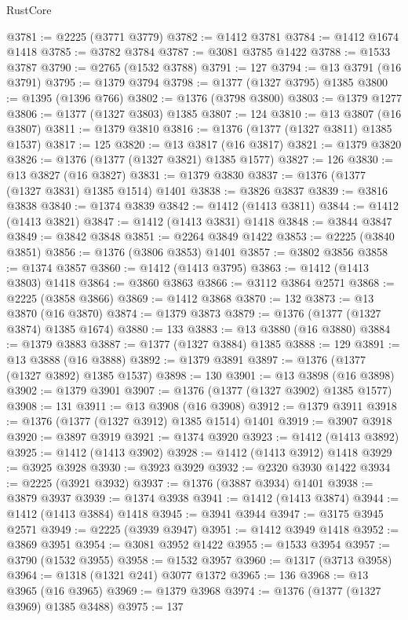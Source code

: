 \begin{lexlean}{RustCore}
\begin{coremodule}
@3781 := @2225 (@3771 @3779)
@3782 := @1412 @3781
@3784 := @1412 @1674 @1418
@3785 := @3782 @3784
@3787 := @3081 @3785 @1422
@3788 := @1533 @3787
@3790 := @2765 (@1532 @3788)
@3791 := 127
@3794 := @13 @3791 (@16 @3791)
@3795 := @1379 @3794
@3798 := @1377 (@1327 @3795) @1385
@3800 := @1395 (@1396 @766)
@3802 := @1376 (@3798 @3800)
@3803 := @1379 @1277
@3806 := @1377 (@1327 @3803) @1385
@3807 := 124
@3810 := @13 @3807 (@16 @3807)
@3811 := @1379 @3810
@3816 := @1376 (@1377 (@1327 @3811) @1385 @1537)
@3817 := 125
@3820 := @13 @3817 (@16 @3817)
@3821 := @1379 @3820
@3826 := @1376 (@1377 (@1327 @3821) @1385 @1577)
@3827 := 126
@3830 := @13 @3827 (@16 @3827)
@3831 := @1379 @3830
@3837 := @1376 (@1377 (@1327 @3831) @1385 @1514) @1401
@3838 := @3826 @3837
@3839 := @3816 @3838
@3840 := @1374 @3839
@3842 := @1412 (@1413 @3811)
@3844 := @1412 (@1413 @3821)
@3847 := @1412 (@1413 @3831) @1418
@3848 := @3844 @3847
@3849 := @3842 @3848
@3851 := @2264 @3849 @1422
@3853 := @2225 (@3840 @3851)
@3856 := @1376 (@3806 @3853) @1401
@3857 := @3802 @3856
@3858 := @1374 @3857
@3860 := @1412 (@1413 @3795)
@3863 := @1412 (@1413 @3803) @1418
@3864 := @3860 @3863
@3866 := @3112 @3864 @2571
@3868 := @2225 (@3858 @3866)
@3869 := @1412 @3868
@3870 := 132
@3873 := @13 @3870 (@16 @3870)
@3874 := @1379 @3873
@3879 := @1376 (@1377 (@1327 @3874) @1385 @1674)
@3880 := 133
@3883 := @13 @3880 (@16 @3880)
@3884 := @1379 @3883
@3887 := @1377 (@1327 @3884) @1385
@3888 := 129
@3891 := @13 @3888 (@16 @3888)
@3892 := @1379 @3891
@3897 := @1376 (@1377 (@1327 @3892) @1385 @1537)
@3898 := 130
@3901 := @13 @3898 (@16 @3898)
@3902 := @1379 @3901
@3907 := @1376 (@1377 (@1327 @3902) @1385 @1577)
@3908 := 131
@3911 := @13 @3908 (@16 @3908)
@3912 := @1379 @3911
@3918 := @1376 (@1377 (@1327 @3912) @1385 @1514) @1401
@3919 := @3907 @3918
@3920 := @3897 @3919
@3921 := @1374 @3920
@3923 := @1412 (@1413 @3892)
@3925 := @1412 (@1413 @3902)
@3928 := @1412 (@1413 @3912) @1418
@3929 := @3925 @3928
@3930 := @3923 @3929
@3932 := @2320 @3930 @1422
@3934 := @2225 (@3921 @3932)
@3937 := @1376 (@3887 @3934) @1401
@3938 := @3879 @3937
@3939 := @1374 @3938
@3941 := @1412 (@1413 @3874)
@3944 := @1412 (@1413 @3884) @1418
@3945 := @3941 @3944
@3947 := @3175 @3945 @2571
@3949 := @2225 (@3939 @3947)
@3951 := @1412 @3949 @1418
@3952 := @3869 @3951
@3954 := @3081 @3952 @1422
@3955 := @1533 @3954
@3957 := @3790 (@1532 @3955)
@3958 := @1532 @3957
@3960 := @1317 (@3713 @3958)
@3964 := @1318 (@1321 @241) @3077 @1372
@3965 := 136
@3968 := @13 @3965 (@16 @3965)
@3969 := @1379 @3968
@3974 := @1376 (@1377 (@1327 @3969) @1385 @3488)
@3975 := 137

\end{coremodule}
\end{lexlean}
